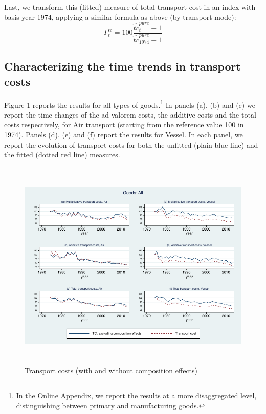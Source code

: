 \documentclass[a4paper,11pt]{article}
\begin{document}
Last, we transform this (fitted) measure of total transport cost in an index with basis year 1974, applying a similar formula as above (by transport mode):
$$\Gamma^{tc}_t = 100\frac{\widehat{tc}^{pure}_t -1 }{\widehat{tc}^{pure}_{1974}-1}$$


\subsection{Characterizing the time trends in transport costs}
Figure \ref{fig:totalTC_compeffects_excl} reports the results for all types of goods.\footnote{In the Online Appendix, we report the results at a more disaggregated level, distinguishing between primary and manufacturing goods.} In panels (a), (b) and (c) we report the time changes of the ad-valorem costs, the additive costs and the total costs respectively, for Air transport (starting from the reference value 100 in 1974).
Panels (d), (e) and (f) report the results for Vessel.
In each panel, we report the evolution of transport costs for both the unfitted (plain blue line) and the fitted (dotted red line) measures.


\begin{figure}[htbp]
\caption{Transport costs (with and without composition effects)}
\label{fig:totalTC_compeffects_excl}
\begin{center}
\includegraphics[height=4in]
{graph_composition_all.pdf}
\end{center}
\end{figure}
\end{document}
